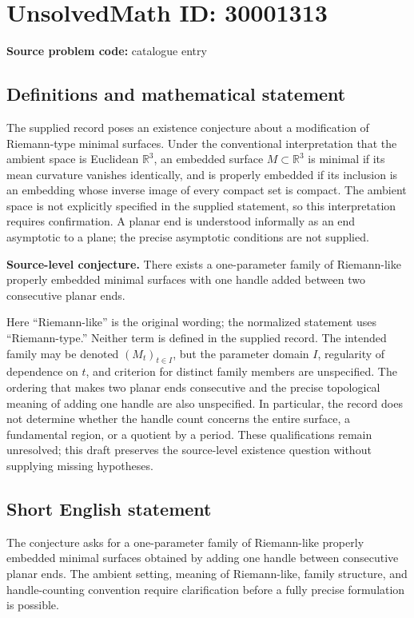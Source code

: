 \documentclass[11pt]{article}
\newcommand{\R}{\mathbb{R}}
\begin{document}
\section*{UnsolvedMath ID: 30001313}
\textbf{Source problem code:} catalogue entry
\subsection{Definitions and mathematical statement}
The supplied record poses an existence conjecture about a modification of Riemann-type minimal surfaces. Under the conventional interpretation that the ambient space is Euclidean \(\R^3\), an embedded surface \(M\subset\R^3\) is minimal if its mean curvature vanishes identically, and is properly embedded if its inclusion is an embedding whose inverse image of every compact set is compact. The ambient space is not explicitly specified in the supplied statement, so this interpretation requires confirmation. A planar end is understood informally as an end asymptotic to a plane; the precise asymptotic conditions are not supplied.

\textbf{Source-level conjecture.} There exists a one-parameter family of Riemann-like properly embedded minimal surfaces with one handle added between two consecutive planar ends.

Here ``Riemann-like'' is the original wording; the normalized statement uses ``Riemann-type.'' Neither term is defined in the supplied record. The intended family may be denoted \((M_t)_{t\in I}\), but the parameter domain \(I\), regularity of dependence on \(t\), and criterion for distinct family members are unspecified. The ordering that makes two planar ends consecutive and the precise topological meaning of adding one handle are also unspecified. In particular, the record does not determine whether the handle count concerns the entire surface, a fundamental region, or a quotient by a period. These qualifications remain unresolved; this draft preserves the source-level existence question without supplying missing hypotheses.
\subsection{Short English statement}
The conjecture asks for a one-parameter family of Riemann-like properly embedded minimal surfaces obtained by adding one handle between consecutive planar ends. The ambient setting, meaning of Riemann-like, family structure, and handle-counting convention require clarification before a fully precise formulation is possible.
\end{document}
